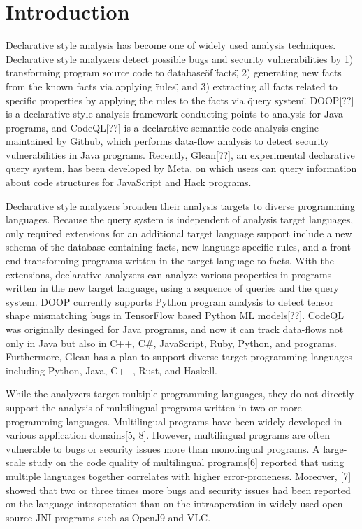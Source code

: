 \section{Introduction}
Declarative style analysis has become one of widely used analysis techniques.
Declarative style analyzers detect possible bugs and
security vulnerabilities by 1) transforming program source code to \"database\"
of \"facts\", 2) generating new facts from the known facts via applying
\"rules\", and 3) extracting all facts related to specific properties by
applying the rules to the facts via \"query system\".  DOOP[??] is a
declarative style analysis framework conducting points-to analysis for Java
programs, and CodeQL[??] is a declarative semantic code analysis engine
maintained by Github, which performs data-flow analysis to detect security
vulnerabilities in Java programs.  Recently, Glean[??], an experimental
declarative query system, has been developed by Meta, on which users can query
information about code structures for JavaScript and Hack programs.

Declarative style analyzers broaden their analysis targets to
diverse programming languages. Because the query system is independent of
analysis target languages, only required extensions for an additional target
language support include a new schema of the database containing facts,
new language-specific rules, and a front-end transforming programs written in the
target language to facts. With the extensions, declarative analyzers can
analyze various properties in programs written in the new target language,
using a sequence of queries and the query system.  DOOP currently supports
Python program analysis to detect tensor shape mismatching bugs in TensorFlow
based Python ML models[??]. CodeQL was originally desinged for Java programs,
and now it can track data-flows not only in Java but also in C++, C\#, JavaScript,
Ruby, Python, and  programs.  Furthermore, Glean has a plan to support
diverse target programming languages including Python, Java, C++, Rust, and
Haskell.

While the analyzers target multiple programming languages, they do not directly
support the analysis of multilingual programs written in two or more programming
languages. Multilingual programs have been widely developed in various
application domains[5, 8]. However, multilingual programs are often vulnerable
to bugs or security issues more than monolingual programs. A large-scale study
on the code quality of multilingual programs[6] reported that using multiple
languages together correlates with higher error-proneness. Moreover, [7] showed
that two or three times more bugs and security issues had been reported on the
language interoperation than on the intraoperation in widely-used open-source
JNI programs such as OpenJ9 and VLC.

